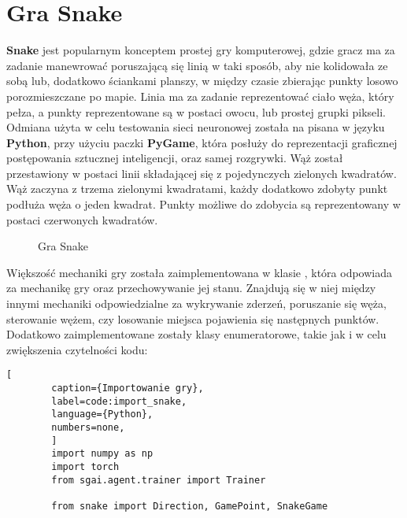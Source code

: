 


\section{Gra Snake}

\textbf{Snake} \cite{SnakeGame} jest popularnym konceptem prostej gry komputerowej, gdzie gracz ma za zadanie manewrować poruszającą się linią w taki sposób, aby nie kolidowała ze sobą lub, dodatkowo ściankami planszy, w między czasie zbierając punkty losowo porozmieszczane po mapie. Linia ma za zadanie reprezentować ciało węża, który pełza, a punkty reprezentowane są w postaci owocu, lub prostej grupki pikseli.
Odmiana użyta w celu testowania sieci neuronowej została na pisana w języku \textbf{Python}, przy użyciu paczki \textbf{PyGame}, która posłuży do reprezentacji graficznej postępowania sztucznej inteligencji, oraz samej rozgrywki.
Wąż został przestawiony w postaci linii składającej się z pojedynczych zielonych kwadratów. Wąż zaczyna z trzema zielonymi kwadratami, każdy dodatkowo zdobyty punkt podłuża węża o jeden kwadrat. Punkty możliwe do zdobycia są reprezentowany w postaci czerwonych kwadratów.

\begin{figure}[h!]
    \centering
    \caption{Gra Snake}
    \label{img:snake_game}
\end{figure}

\clearpage

Większość mechaniki gry została zaimplementowana w klasie , która odpowiada za mechanikę gry oraz przechowywanie jej stanu. Znajdują się w niej między innymi mechaniki odpowiedzialne za wykrywanie zderzeń, poruszanie się węża, sterowanie wężem, czy losowanie miejsca pojawienia się następnych punktów. Dodatkowo zaimplementowane zostały klasy enumeratorowe, takie jak  i  w celu zwiększenia czytelności kodu:

\begin{onepage}
    \begin{lstlisting}[
        caption={Importowanie gry},
        label=code:import_snake,
        language={Python},
        numbers=none,
        ]
        import numpy as np
        import torch
        from sgai.agent.trainer import Trainer
        
        from snake import Direction, GamePoint, SnakeGame
    \end{lstlisting}
\end{onepage}



